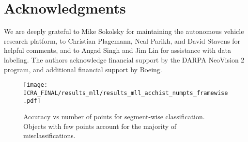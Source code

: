 \documentclass[letterpaper, 10 pt, conference]{ieeeconf}  %
\begin{document}
\section{Acknowledgments}

We are deeply grateful to Mike Sokolsky for maintaining the autonomous vehicle research platform, to Christian Plagemann, Neal Parikh, and David Stavens for helpful comments, and to Angad Singh and Jim Lin for assistance with data labeling.  The authors acknowledge financial support by the DARPA NeoVision 2 program, and additional financial support by Boeing.




\begin{figure}
  \centering
  \texttt{[image: ICRA\_FINAL/results\_mll/results\_mll\_acchist\_numpts\_framewise.pdf]}
  \caption{Accuracy vs number of points for segment-wise classification.  Objects with few points account for the majority of misclassifications.}
  \label{fig:acchist_numpts}
\end{figure}
\end{document}
